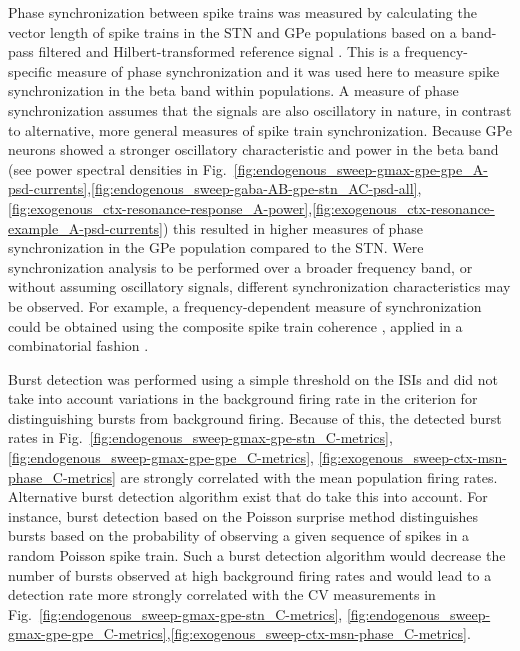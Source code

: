 %
%
%
%
%
%
%
%
%
Phase synchronization between spike trains was measured by calculating the vector length
of spike trains in the STN and GPe populations based on a band-pass filtered and Hilbert-transformed
reference signal \cite{lachaux_measuring_1999}. This is a frequency-specific measure of
phase synchronization and it was used here to measure spike synchronization in the beta band
within populations. A measure of phase synchronization assumes that the signals are also
oscillatory in nature, in contrast to alternative, more general measures of spike train
synchronization. Because GPe neurons showed a stronger oscillatory characteristic and
power in the beta band (see power spectral densities in Fig.~\ref{fig:endogenous_sweep-gmax-gpe-gpe_A-psd-currents},\ref{fig:endogenous_sweep-gaba-AB-gpe-stn_AC-psd-all},\ref{fig:exogenous_ctx-resonance-response_A-power},\ref{fig:exogenous_ctx-resonance-example_A-psd-currents}) this resulted in higher measures of phase synchronization in the GPe population
compared to the STN. Were synchronization analysis to be performed over a broader
frequency band, or without assuming oscillatory signals, different synchronization
characteristics may be observed. For example, a frequency-dependent measure of
synchronization could be obtained using the composite spike train coherence \cite{terry_how_2008},
applied in a combinatorial fashion \cite{mcmanus_muscle_2016}.
%
%
%
%

%
%
Burst detection was performed using a simple threshold on the ISIs and did not take
into account variations in the background firing rate in the criterion for distinguishing
bursts from background firing. Because of this, the detected burst rates in Fig.~\ref{fig:endogenous_sweep-gmax-gpe-stn_C-metrics},\ref{fig:endogenous_sweep-gmax-gpe-gpe_C-metrics},
\ref{fig:exogenous_sweep-ctx-msn-phase_C-metrics} are strongly correlated with the
mean population firing rates. Alternative burst detection algorithm exist that do take this
into account. For instance, burst detection based on the Poisson surprise method \cite{legendy_bursts_1985}
distinguishes bursts based on the probability of observing a given sequence of spikes
in a random Poisson spike train. Such a burst detection algorithm would decrease the number of
bursts observed at high background firing rates and would lead to a detection rate
more strongly correlated with the CV measurements in Fig.~\ref{fig:endogenous_sweep-gmax-gpe-stn_C-metrics},
\ref{fig:endogenous_sweep-gmax-gpe-gpe_C-metrics},\ref{fig:exogenous_sweep-ctx-msn-phase_C-metrics}.

